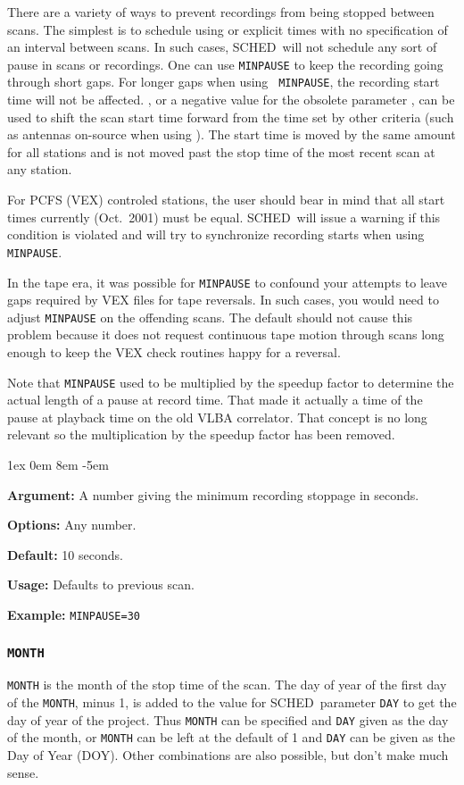 \documentclass{report}
\newcommand{\schedb}{{\sc SCHED~}}
\newcommand{\rcwbox}[5]{
  \begin{list}{}{\parsep 1ex  \itemsep 0em
                 \leftmargin 8em  \itemindent -5em }
    \item {\bf Argument:} #1
    \item {\bf Options:}  #2
    \item {\bf Default:}  #3
    \item {\bf Usage:}    #4
    \item {\bf Example:}  #5
  \end{list}
}
\begin{document}
There are a variety of ways to prevent recordings from being stopped
between scans.  The simplest is to schedule using  or explicit times with no specification of an interval
between scans.  In such cases, \schedb will not schedule any sort of
pause in scans or recordings.  One can use {\tt MINPAUSE} to keep the
recording going through short gaps.  For longer gaps when using {\tt
MINPAUSE}, the recording start time will not be affected.  , or a negative value for the obsolete
parameter , can be used to shift
the scan start time forward from the time set by other criteria (such
as antennas on-source when using ).
The start time is moved by the same amount for all stations and is not
moved past the stop time of the most recent scan at any station.

For PCFS (VEX) controled stations, the user should bear in mind that
all start times currently (Oct.\ 2001) must be equal. \schedb will
issue a warning if this condition is violated and will try to
synchronize recording starts when using {\tt MINPAUSE}.

In the tape era, it was possible for {\tt MINPAUSE} to confound your
attempts to leave gaps required by VEX files for tape reversals.  In
such cases, you would need to adjust {\tt MINPAUSE} on the offending
scans.  The default should not cause this problem because it does not
request continuous tape motion through scans long enough to keep the
VEX check routines happy for a reversal.

Note that {\tt MINPAUSE} used to be multiplied by the speedup factor
to determine the actual length of a pause at record time.  That made
it actually a time of the pause at playback time on the old VLBA
correlator.  That concept is no long relevant so the multiplication
by the speedup factor has been removed.

\rcwbox
{A number giving the minimum recording stoppage in seconds.}
{Any number.}
{10 seconds.}
{Defaults to previous scan.}
{{\tt MINPAUSE=30}}



\subsubsection{\label{MP:MONTH}{\tt MONTH}}

{\tt MONTH} is the month of the stop time of the scan.  The day of
year of the first day of the {\tt MONTH}, minus 1, is added to the
value for \schedb parameter {\tt DAY} to get the day of year of
the project.  Thus {\tt MONTH} can be specified and {\tt DAY} given
as the day of the month, or {\tt MONTH} can be left at the default
of 1 and {\tt DAY} can be given as the Day of Year (DOY).  Other
combinations are also possible, but don't make much sense.
\end{document}
